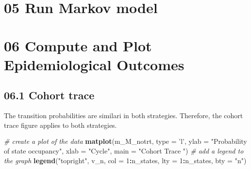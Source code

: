 \documentclass[
]{article}
\newenvironment{Shaded}{\begin{snugshade}}{\end{snugshade}}
\newcommand{\CommentTok}[1]{\textcolor[rgb]{0.56,0.35,0.01}{\textit{#1}}}
\newcommand{\ControlFlowTok}[1]{\textcolor[rgb]{0.13,0.29,0.53}{\textbf{#1}}}
\newcommand{\DataTypeTok}[1]{\textcolor[rgb]{0.13,0.29,0.53}{#1}}
\newcommand{\DecValTok}[1]{\textcolor[rgb]{0.00,0.00,0.81}{#1}}
\newcommand{\KeywordTok}[1]{\textcolor[rgb]{0.13,0.29,0.53}{\textbf{#1}}}
\newcommand{\NormalTok}[1]{#1}
\newcommand{\OperatorTok}[1]{\textcolor[rgb]{0.81,0.36,0.00}{\textbf{#1}}}
\newcommand{\StringTok}[1]{\textcolor[rgb]{0.31,0.60,0.02}{#1}}
\begin{document}
\hypertarget{run-markov-model}{%
\section{05 Run Markov model}\label{run-markov-model}}

\begin{Shaded}
\end{Shaded}

\hypertarget{compute-and-plot-epidemiological-outcomes}{%
\section{06 Compute and Plot Epidemiological
Outcomes}\label{compute-and-plot-epidemiological-outcomes}}

\hypertarget{cohort-trace-1}{%
\subsection{06.1 Cohort trace}\label{cohort-trace-1}}

The transition probabilities are similari in both strategies. Therefore,
the cohort trace figure applies to both strategies.

\begin{Shaded}
\begin{Highlighting}[]
\CommentTok{# create a plot of the data}
\KeywordTok{matplot}\NormalTok{(m_M_notrt, }\DataTypeTok{type =} \StringTok{'l'}\NormalTok{, }
        \DataTypeTok{ylab =} \StringTok{"Probability of state occupancy"}\NormalTok{,}
        \DataTypeTok{xlab =} \StringTok{"Cycle"}\NormalTok{,}
        \DataTypeTok{main =} \StringTok{"Cohort Trace "}\NormalTok{)             }
\CommentTok{# add a legend to the graph}
\KeywordTok{legend}\NormalTok{(}\StringTok{"topright"}\NormalTok{, v_n, }\DataTypeTok{col =} \DecValTok{1}\OperatorTok{:}\NormalTok{n_states, }\DataTypeTok{lty =} \DecValTok{1}\OperatorTok{:}\NormalTok{n_states, }\DataTypeTok{bty =} \StringTok{"n"}\NormalTok{) }
\end{Highlighting}
\end{Shaded}
\end{document}
